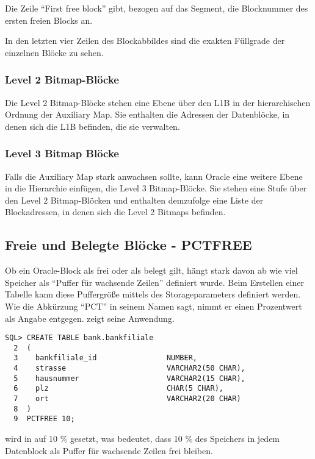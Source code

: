           Die Zeile \enquote{First free block} gibt, bezogen auf das Segment, die Blocknummer des ersten freien Blocks an.

          In den letzten vier Zeilen des Blockabbildes sind die exakten Füllgrade der einzelnen Blöcke zu sehen.
        \subsubsection{Level 2 Bitmap-Blöcke}
          Die Level 2 Bitmap-Blöcke stehen eine Ebene über den L1B in der hierarchischen Ordnung der Auxiliary Map. Sie enthalten die Adressen der Datenblöcke, in denen sich die L1B befinden, die sie verwalten.
        \subsubsection{Level 3 Bitmap Blöcke}
          Falls die Auxiliary Map stark anwachsen sollte, kann Oracle eine weitere Ebene in die Hierarchie einfügen, die Level 3 Bitmap-Blöcke. Sie stehen eine Stufe über den Level 2 Bitmap-Blöcken und enthalten demzufolge eine Liste der Blockadressen, in denen sich die Level 2 Bitmaps befinden.
      \subsection{Freie und Belegte Blöcke - PCTFREE}
        Ob ein Oracle-Block als frei oder als belegt gilt, hängt stark davon ab wie viel Speicher als \enquote{Puffer für wachsende Zeilen} definiert wurde. Beim Erstellen einer Tabelle kann diese Puffergröße mittels des Storageparameters  definiert werden. Wie die Abkürzung \enquote{PCT} in seinem Namen sagt, nimmt er einen Prozentwert als Angabe entgegen.  zeigt seine Anwendung.
        \begin{lstlisting}[caption={Der Storageparameter \languageorasql{pctfree}},label=admin102,language=oracle_sql]
SQL> CREATE TABLE bank.bankfiliale
  2  (
  3    bankfiliale_id                NUMBER,
  4    strasse                       VARCHAR2(50 CHAR),
  5    hausnummer                    VARCHAR2(15 CHAR),
  6    plz                           CHAR(5 CHAR),
  7    ort                           VARCHAR2(20 CHAR)
  8  )
  9  PCTFREE 10;
        \end{lstlisting}
         wird in  auf 10 \% gesetzt, was bedeutet, dass 10 \% des Speichers in jedem Datenblock als Puffer für wachsende Zeilen frei bleiben.

